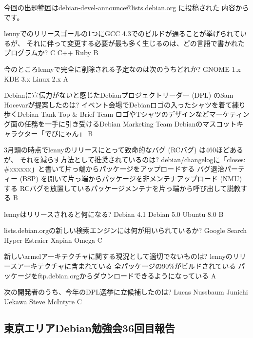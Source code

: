\documentclass[mingoth,a4paper]{jsarticle}
\begin{document}
今回の出題範囲は\url{debian-devel-announce@lists.debian.org} に投稿された
内容からです。
\begin{multicols}{2}

 \santaku
 {lennyでのリリースゴールの1つにGCC 4.3でのビルドが通ることが挙げられているが、
 それに伴って変更する必要が最も多く生じるのは、どの言語で書かれたプログラムか?}
 {C}
 {C++}
 {Ruby}
 {B}
 
 \santaku
 {今のところlennyで完全に削除される予定なのは次のうちどれか?}
 {GNOME 1.x}
 {KDE 3.x}
 {Linux 2.x}
 {A}
 
 \santaku
 {Debianに宣伝力がないと感じたDebianプロジェクトリーダー (DPL) のSam Hocevarが提案したのは?}
 {イベント会場でDebianロゴの入ったシャツを着て練り歩くDebian Tank Top \& Brief Team}
 {ロゴやTシャツのデザインなどマーケティング面の任務を一手に引き受けるDebian Marketing Team}
 {Debianのマスコットキャラクター「でびにゃん」}
 {B}
 
 \santaku
 {3月頭の時点でlennyのリリースにとって致命的なバグ (RCバグ) は460ほどあるが、
 それを減らす方法として推奨されているのは?}
 {debian/changelogに「closes: \#xxxxxx」と書いて片っ端からパッケージをアップロードする}
 {バグ退治パーティー (BSP) を開いて片っ端からパッケージを非メンテナアップロード (NMU) する}
 {RCバグを放置しているパッケージメンテナを片っ端から呼び出して説教する}
 {B}
 
 \santaku
 {lennyはリリースされると何になる?}
 {Debian 4.1}
 {Debian 5.0}
 {Ubuntu 8.0}
 {B}
 
 \santaku
 {lists.debian.orgの新しい検索エンジンには何が用いられているか?}
 {Google Search}
 {Hyper Estraier}
 {Xapian Omega}
 {C}
 
 \santaku
 {新しいarmelアーキテクチャに関する現況として適切でないものは?}
 {lennyのリリースアーキテクチャに含まれている}
 {全パッケージの90\%がビルドされている}
 {パッケージをftp.debian.orgからダウンロードできるようになっている}
 {A}
 
 \santaku
 {次の開発者のうち、今年のDPL選挙に立候補したのは?}
 {Lucas Nussbaum}
 {Junichi Uekawa}
 {Steve McIntyre}
 {C}

\end{multicols}

\subsection{東京エリアDebian勉強会36回目報告}
\end{document}

